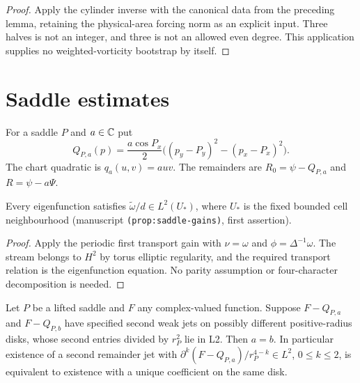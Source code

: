 \begin{proof}
\leanok
Apply the cylinder inverse with the canonical data from the preceding lemma,
retaining the physical-area forcing norm as an explicit input.
Three halves is not an integer, and three is not an allowed even degree.
This application supplies no weighted-vorticity bootstrap by itself.
\end{proof}

\section{Saddle estimates}

\begin{definition}
\label{def:saddle-quadratic}
\leanok
For a saddle $P$ and $a\in\mathbb{C}$ put
\[
 Q_{P,a}(p)=\frac{a\cos P_x}{2}
              \bigl((p_y-P_y)^2-(p_x-P_x)^2\bigr).
\]
The chart quadratic is $q_a(u,v)=auv$.
The remainders are $R_0=\psi-Q_{P,a}$ and $R=\psi-a\Psi$.
\end{definition}

\begin{proposition}
\label{prop:saddle-first-gain}
\leanok
Every eigenfunction satisfies $\widetilde\omega/d\in L^2(U_*)$, where
$U_*$ is the fixed bounded cell neighbourhood (manuscript
\texttt{(prop:saddle-gains)}, first assertion).
\end{proposition}

\begin{proof}
\leanok
Apply the periodic first transport gain with $\nu=\omega$ and
$\phi=\Delta^{-1}\omega$. The stream belongs to $H^2$ by torus elliptic
regularity, and the required transport relation is the eigenfunction
equation. No parity assumption or four-character decomposition is needed.
\end{proof}

\begin{lemma}
\label{lem:saddle-coefficient-uniqueness}
\leanok
Let $P$ be a lifted saddle and $F$ any complex-valued function.
Suppose $F-Q_{P,a}$ and $F-Q_{P,b}$ have specified second weak jets
on possibly different positive-radius disks, whose second entries divided
by $r_P^2$ lie in L2. Then $a=b$.
In particular existence of a second remainder jet with
$\partial^k(F-Q_{P,a})/r_P^{4-k}\in L^2$, $0\le k\le2$, is equivalent
to existence with a unique coefficient on the same disk.
\end{lemma}

